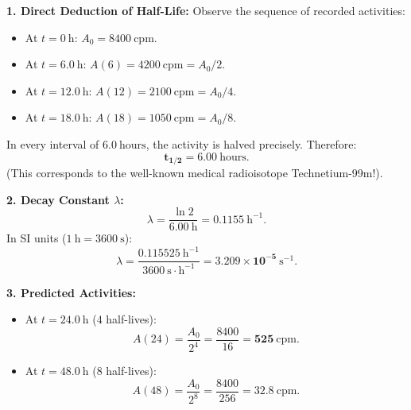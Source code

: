 \begin{solution}
\textbf{1. Direct Deduction of Half-Life:}
Observe the sequence of recorded activities:
\begin{itemize}[itemsep=1pt]
  \item At $t = 0\ \mathrm{h}$: $A_0 = 8400\ \mathrm{cpm}$.
  \item At $t = 6.0\ \mathrm{h}$: $A(6) = 4200\ \mathrm{cpm} = A_0 / 2$.
  \item At $t = 12.0\ \mathrm{h}$: $A(12) = 2100\ \mathrm{cpm} = A_0 / 4$.
  \item At $t = 18.0\ \mathrm{h}$: $A(18) = 1050\ \mathrm{cpm} = A_0 / 8$.
\end{itemize}
In every interval of $6.0\ \mathrm{hours}$, the activity is halved precisely. Therefore:
\[
\mathbf{t_{1/2} = 6.00\ \mathrm{hours}}.
\]
(This corresponds to the well-known medical radioisotope Technetium-99m!).

\textbf{2. Decay Constant $\lambda$:}
\[
\lambda = \frac{\ln 2}{6.00\ \mathrm{h}} = \mathbf{0.1155\ \mathrm{h^{-1}}}.
\]
In SI units ($1\ \mathrm{h} = 3600\ \mathrm{s}$):
\[
\lambda = \frac{0.115525\ \mathrm{h^{-1}}}{3600\ \mathrm{s\cdot h^{-1}}} = \mathbf{3.209 \times 10^{-5}\ \mathrm{s^{-1}}}.
\]

\textbf{3. Predicted Activities:}
\begin{itemize}[itemsep=1pt]
  \item At $t = 24.0\ \mathrm{h}$ ($4$ half-lives):
  \[
  A(24) = \frac{A_0}{2^4} = \frac{8400}{16} = \mathbf{525\ \mathrm{cpm}}.
  \]
  \item At $t = 48.0\ \mathrm{h}$ ($8$ half-lives):
  \[
  A(48) = \frac{A_0}{2^8} = \frac{8400}{256} = \mathbf{32.8\ \mathrm{cpm}}.
  \]
\end{itemize}
\end{solution}


